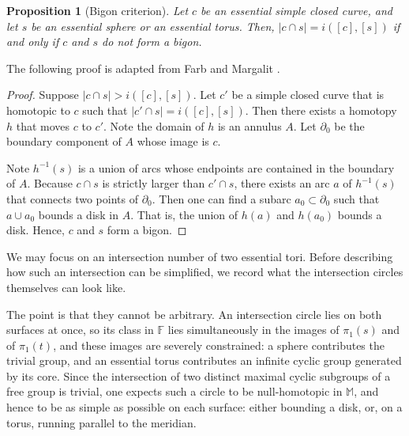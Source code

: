 \documentclass[12pt,a4paper]{amsart}
\numberwithin{equation}{section}
\newcommand{\FF}{\mathbb{F}}
\newcommand{\MM}{\mathbb{M}}
\theoremstyle{plain}
\newtheorem{proposition}[theorem]{Proposition}
\theoremstyle{definition}
\theoremstyle{remark}
\begin{document}
\begin{proposition}[Bigon criterion]
    Let $c$ be an essential simple closed curve, and let $s$ be an essential sphere or an essential torus.
    Then, $\lvert c \cap s \rvert = i([c], [s])$ if and only if $c$ and $s$ do not form a bigon.
\end{proposition}

The following proof is adapted from Farb and Margalit \cite{MR2850125}.

\begin{proof}
    Suppose $\lvert c \cap s \rvert > i([c], [s])$.
    Let $c'$ be a simple closed curve that is homotopic to $c$ such that $\lvert c' \cap s \rvert = i([c], [s])$.
    Then there exists a homotopy $h$ that moves $c$ to $c'$.
    Note the domain of $h$ is an annulus $A$.
    Let $\partial_0$ be the boundary component of $A$ whose image is $c$.
    
    Note $h^{-1}(s)$ is a union of arcs whose endpoints are contained in the boundary of $A$.
    Because $c \cap s$ is strictly larger than $c' \cap s$, there exists an arc $a$ of $h^{-1}(s)$ that connects two points of $\partial_0$.
    Then one can find a subarc $a_0 \subset \partial_0$ such that $a \cup a_0$ bounds a disk in $A$.
    That is, the union of $h(a)$ and $h(a_0)$ bounds a disk.
    Hence, $c$ and $s$ form a bigon.
\end{proof}

We may focus on an intersection number of two essential tori.
Before describing how such an intersection can be simplified, we record what the intersection circles themselves can look like.

The point is that they cannot be arbitrary.
An intersection circle lies on both surfaces at once, so its class in $\FF$ lies simultaneously in the images of $\pi_1(s)$ and of $\pi_1(t)$, and these images are severely constrained: a sphere contributes the trivial group, and an essential torus contributes an infinite cyclic group generated by its core.
Since the intersection of two distinct maximal cyclic subgroups of a free group is trivial, one expects such a circle to be null-homotopic in $\MM$, and hence to be as simple as possible on each surface: either bounding a disk, or, on a torus, running parallel to the meridian.
\end{document}
